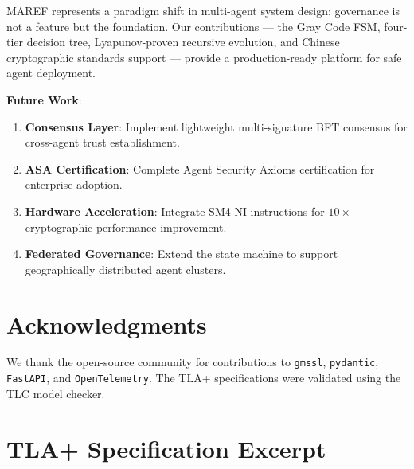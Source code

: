 \documentclass[11pt,a4paper]{article}
\begin{document}
MAREF represents a paradigm shift in multi-agent system design: governance is not a feature but the foundation. Our contributions --- the Gray Code FSM, four-tier decision tree, Lyapunov-proven recursive evolution, and Chinese cryptographic standards support --- provide a production-ready platform for safe agent deployment.

\textbf{Future Work}:

\begin{enumerate}
  \item \textbf{Consensus Layer}: Implement lightweight multi-signature BFT consensus for cross-agent trust establishment.
  \item \textbf{ASA Certification}: Complete Agent Security Axioms certification for enterprise adoption.
  \item \textbf{Hardware Acceleration}: Integrate SM4-NI instructions for $10\times$ cryptographic performance improvement.
  \item \textbf{Federated Governance}: Extend the state machine to support geographically distributed agent clusters.
\end{enumerate}

\section*{Acknowledgments}

We thank the open-source community for contributions to \texttt{gmssl}, \texttt{pydantic}, \texttt{FastAPI}, and \texttt{OpenTelemetry}. The TLA+ specifications were validated using the TLC model checker.



\appendix

\section{TLA+ Specification Excerpt}
\label{app:tla}
\end{document}
